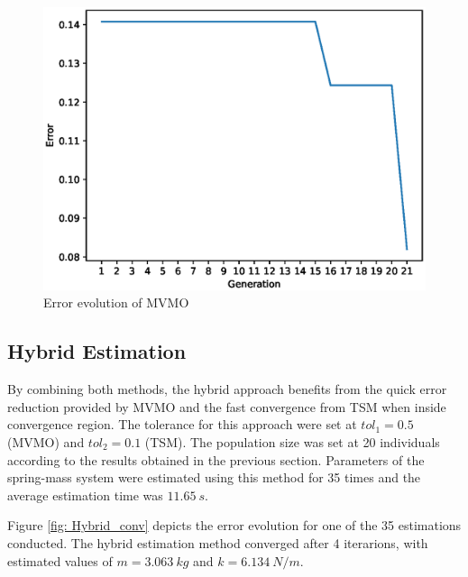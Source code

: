 \begin{figure}[h]
	\caption{Error evolution of MVMO}
	\begin{center}
		\includegraphics[scale=0.6]{Images/MVMO_conv.eps}
	\end{center}
	\label{fig: MVMO_conv}
\end{figure}

\subsection{Hybrid Estimation}

By combining both methods, the hybrid approach benefits from the quick error reduction provided by MVMO and the fast convergence from TSM when inside convergence region. The tolerance for this approach were set at $tol_{1} = 0.5$ (MVMO) and $tol_{2} = 0.1$ (TSM). The population size was set at 20 individuals according to the results obtained in the previous section. Parameters of the spring-mass system were estimated using this method for 35 times and the average estimation time was $11.65\ s$.

Figure \ref{fig: Hybrid_conv} depicts the error evolution for one of the 35 estimations conducted. The hybrid estimation method converged after 4 iterarions, with estimated values of $m=3.063\ kg$ and $k=6.134\ N/m$.


